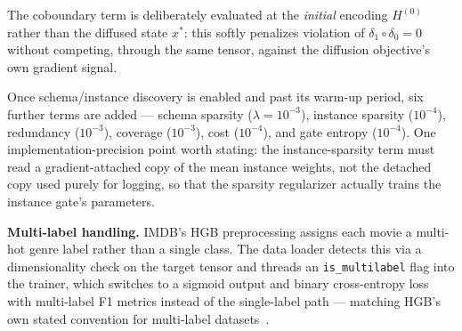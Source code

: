 \documentclass{article}
\begin{document}
\begin{table}[h]
  \centering
  \caption{Sheaf-geometric regularizer terms and their default weights.}
  \label{tab:loss-terms}
  \small
\end{table}

The coboundary term is deliberately evaluated at the \emph{initial} encoding $H^{(0)}$ rather than
the diffused state $x^*$: this softly penalizes violation of $\delta_1 \circ \delta_0 = 0$ without
competing, through the same tensor, against the diffusion objective's own gradient signal.

Once schema/instance discovery is enabled and past its warm-up period, six further terms are added
--- schema sparsity ($\lambda=10^{-3}$), instance sparsity ($10^{-4}$), redundancy ($10^{-3}$),
coverage ($10^{-3}$), cost ($10^{-4}$), and gate entropy ($10^{-4}$). One implementation-precision
point worth stating: the instance-sparsity term must read a gradient-attached copy of the mean
instance weights, not the detached copy used purely for logging, so that the sparsity regularizer
actually trains the instance gate's parameters.

\textbf{Multi-label handling.} IMDB's HGB preprocessing assigns each movie a multi-hot genre label
rather than a single class. The data loader detects this via a dimensionality check on the target
tensor and threads an \texttt{is\_multilabel} flag into the trainer, which switches to a sigmoid
output and binary cross-entropy loss with multi-label F1 metrics instead of the single-label path
--- matching HGB's own stated convention for multi-label datasets~\citep{lv2021hgb}.
\end{document}
